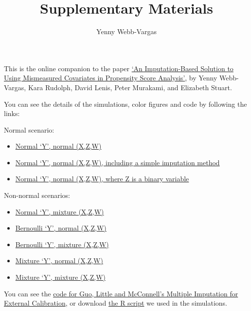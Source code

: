 \documentclass[]{article}
\title{Supplementary Materials}
\author{Yenny Webb-Vargas}
\date{}
\begin{document}
\maketitle


This is the online companion to the paper
\href{http://biostats.bepress.com/jhubiostat/paper269/}{`An
Imputation-Based Solution to Using Mismeasured Covariates in Propensity
Score Analysis'}, by Yenny Webb-Vargas, Kara Rudolph, David Lenis, Peter
Murakami, and Elizabeth Stuart.

You can see the details of the simulations, color figures and code by
following the links:

Normal scenario:

\begin{itemize}
\itemsep1pt\parskip0pt
\item
  \href{http://ywebbvar.github.io/PS_MIEC/Simulations/Y_normal_XZW_normal/}{Normal
  `Y', normal (X,Z,W)}
\item
  \href{http://ywebbvar.github.io/PS_MIEC/Simulations/Simple_imputation/Y_normal_XZW_normal/}{Normal
  `Y', normal (X,Z,W), including a simple imputation method}
\item
  \href{http://ywebbvar.github.io/PS_MIEC/Simulations/Sample_sizes/Y_normal_XZW_normal/}{Normal
  `Y', normal (X,Z,W), where Z is a binary variable}
\end{itemize}

Non-normal scenarios:

\begin{itemize}
\itemsep1pt\parskip0pt
\item
  \href{http://ywebbvar.github.io/PS_MIEC/Simulations/Y_normal_XZW_mixture/}{Normal
  `Y', mixture (X,Z,W)}
\item
  \href{http://ywebbvar.github.io/PS_MIEC/Simulations/Y_bernoulli_XZW_normal/}{Bernoulli
  `Y', normal (X,Z,W)}
\item
  \href{http://ywebbvar.github.io/PS_MIEC/Simulations/Y_bernoulli_XZW_mixture/}{Bernoulli
  `Y', mixture (X,Z,W)}
\item
  \href{http://ywebbvar.github.io/PS_MIEC/Simulations/Y_mixture_XZW_normal/}{Mixture
  `Y', normal (X,Z,W)}
\item
  \href{http://ywebbvar.github.io/PS_MIEC/Simulations/Y_mixture_XZW_mixture/}{Mixture
  `Y', mixture (X,Z,W)}
\end{itemize}

You can see the
\href{http://ywebbvar.github.io/PS_MIEC/MIEC_original/}{code for Guo,
Little and McConnell's Multiple Imputation for External Calibration}, or
download
\href{http://ywebbvar.github.io/PS_MIEC/MIEC_original/MI-EC_algorithm.r}{the
R script} we used in the simulations.
\end{document}
